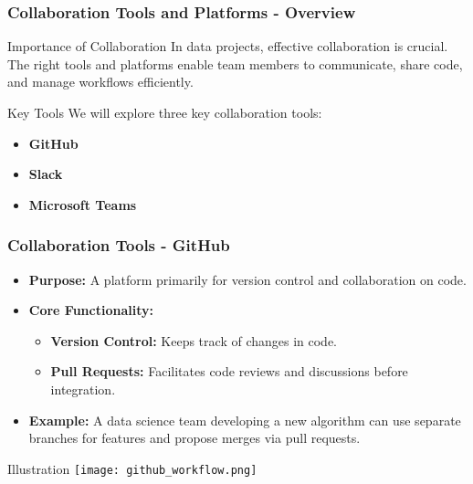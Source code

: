 \documentclass[aspectratio=169]{beamer}
\begin{document}
\begin{frame}[fragile]
    \frametitle{Collaboration Tools and Platforms - Overview}
    \begin{block}{Importance of Collaboration}
        In data projects, effective collaboration is crucial. The right tools and platforms enable team members to communicate, share code, and manage workflows efficiently.
    \end{block}
    \begin{block}{Key Tools}
        We will explore three key collaboration tools: 
        \begin{itemize}
            \item \textbf{GitHub}
            \item \textbf{Slack}
            \item \textbf{Microsoft Teams}
        \end{itemize}
    \end{block}
\end{frame}

\begin{frame}[fragile]
    \frametitle{Collaboration Tools - GitHub}
    \begin{itemize}
        \item \textbf{Purpose:} A platform primarily for version control and collaboration on code.
        \item \textbf{Core Functionality:}
        \begin{itemize}
            \item \textbf{Version Control:} Keeps track of changes in code.
            \item \textbf{Pull Requests:} Facilitates code reviews and discussions before integration.
        \end{itemize}
        \item \textbf{Example:} A data science team developing a new algorithm can use separate branches for features and propose merges via pull requests.
    \end{itemize}
    \begin{block}{Illustration}
        \centering
        \texttt{[image: github\_workflow.png]}
    \end{block}
\end{frame}
\end{document}
